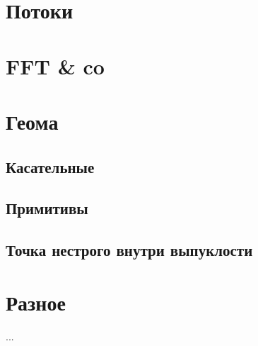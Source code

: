 \documentclass[a4paper,twocolumn,8pt]{extarticle}
\begin{document}
    \section{Потоки}
    
    

    \section{FFT \& co}
    
    \section{Геома}
    \subsection{Касательные}
    
    \subsection{Примитивы}
    
    \subsection{Точка нестрого внутри выпуклости}
    
    \section{Разное}
    
    ...
\end{document}

